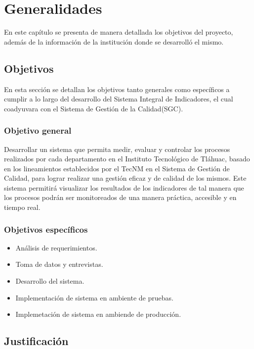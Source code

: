 \chapter{Generalidades}
    En este cap\'itulo se presenta de manera detallada los objetivos del proyecto, adem\'as de la informaci\'on de la instituci\'on donde se desarroll\'o el mismo.
    
    \section{Objetivos}
    En esta secci\'on se detallan los objetivos tanto generales como espec\'ificos a cumplir a lo largo del desarrollo del Sistema Integral de Indicadores, el cual coadyuvara con el Sistema de Gesti\'on de la Calidad(SGC).

\subsection{Objetivo general}

Desarrollar un sistema que permita medir, evaluar y controlar los procesos realizados por cada departamento en el Instituto Tecnol\'ogico de Tl\'ahuac, basado en los lineamientos establecidos por el TecNM en el Sistema de Gesti\'on de Calidad, para lograr realizar una gesti\'on eficaz y de calidad de los mismos.
Este sistema permitir\'a visualizar los resultados de los indicadores de tal manera que los procesos podr\'an ser monitoreados de una manera pr\'actica, accesible y en tiempo real.


\subsection{Objetivos espec\'ificos}
\begin{itemize}
    \item An\'alisis de requerimientos.
    \item Toma de datos y entrevistas.
    \item Desarrollo del sistema.
    \item Implementaci\'on de sistema en ambiente de pruebas.
    \item Implemetaci\'on de sistema en ambiende de producci\'on.
\end{itemize}

\section{Justificaci\'on}
\paragraph{}%

